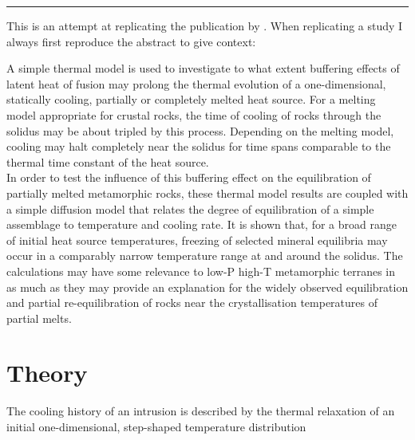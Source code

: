 \par\noindent\rule{\textwidth}{0.4pt}




This is an attempt at replicating the publication by . 
When replicating a study I always first reproduce the abstract to give context:
\begin{displayquote}
{\color{darkgray}
A simple thermal model is used to investigate to what extent buffering effects 
of latent heat of fusion may prolong the thermal evolution of a one-dimensional, 
statically cooling, partially or completely melted heat source.
For a melting model appropriate for crustal rocks, the time of cooling of rocks 
through the solidus may be about tripled by this process. Depending on the melting 
model, cooling may halt completely near the solidus for time spans
comparable to the thermal time constant of the heat source.\\
In order to test the influence of this buffering effect on the equilibration of 
partially melted metamorphic rocks, these thermal model results are coupled with 
a simple diffusion model that relates the degree of equilibration of a
simple assemblage to temperature and cooling rate. It is shown that, for a broad 
range of initial heat source temperatures, freezing of selected mineral equilibria 
may occur in a comparably narrow temperature range at and
around the solidus. The calculations may have some relevance to low-P high-T 
metamorphic terranes in as much as they may provide an explanation for the widely 
observed equilibration and partial re-equilibration of rocks near the
crystallisation temperatures of partial melts.}
\end{displayquote}

\newpage
\section*{Theory}

The cooling history of an intrusion is described by the
thermal relaxation of an initial one-dimensional,
step-shaped temperature distribution

